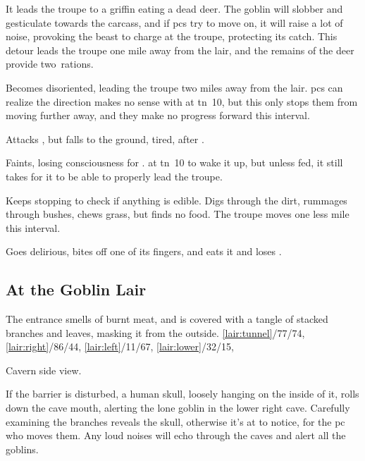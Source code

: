 \documentclass[10pt,twoside]{book}
\begin{document}
\begin{dlist}
  \item
  It leads the troupe to a griffin eating a dead deer.
  The goblin will slobber and gesticulate towards the carcass, and if \glspl{pc} try to move on, it will raise a lot of noise, provoking the beast to charge at the troupe, protecting its catch.
  This detour leads the troupe one mile away from the lair, and the remains of the deer provide two~\glspl{ration}.
  \item
  Becomes disoriented, leading the troupe two miles away from the lair.
  \glspl{pc} can realize the direction makes no sense with  at \gls{tn}~10, but this only stops them from moving further away, and they make no progress forward this \gls{interval}.
  \item
  Attacks , but falls to the ground, tired, after .
  \item
  Faints, losing consciousness for .
   at \gls{tn}~10 to wake it up, but unless fed, it still takes  for it to be able to properly lead the troupe.
  \item
  Keeps stopping to check if anything is edible.
  Digs through the dirt, rummages through bushes, chews grass, but finds no food.
  The troupe moves one less mile this \gls{interval}.
  \item
  Goes delirious, bites off one of its fingers, and eats it and loses .
\end{dlist}

\clearpage
\subsection{At the Goblin Lair}
The entrance smells of burnt meat, and is covered with a tangle of stacked branches and leaves, masking it from the outside.
%
  {%
    \ref{lair:tunnel}/77/74,
    \ref{lair:right}/86/44,
    \ref{lair:left}/11/67,
    \ref{lair:lower}/32/15,
  }%
{Cavern side view.\par\null}

If the barrier is disturbed, a human skull, loosely hanging on the inside of it, rolls down the cave mouth, alerting the lone goblin in the lower right cave.
Carefully examining the branches reveals the skull, otherwise it's  at \tn[8] to notice, for the \gls{pc} who moves them.
Any loud noises will echo through the caves and alert all the goblins.
\end{document}
